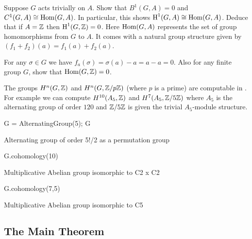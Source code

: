 \begin{exercise}\label{ex:H1hom}
	Suppose $G$ acts trivially on $A$.
	Show that $B^1(G,A)=0$ and $C^1(G,A) \cong \operatorname{Hom}(G,A)$.
	In particular, this shows $\operatorname{H}^1(G,A) \cong \operatorname{Hom}(G,A)$.
	Deduce that if $A = \mathbb{Z}$ then $\operatorname{H}^1(G,\mathbb{Z}) = 0$.
	Here $\operatorname{Hom}(G,A)$ represents the set of group homomorphisms
	from $G$ to $A$. It comes with a natural group structure
	given by $(f_1+f_2)(a) = f_1(a)+f_2(a)$.

	\begin{hint}
		For any $\sigma\in G$ we have
		$f_a(\sigma) = \sigma(a) - a = a - a = 0$.
		Also for any finite group $G$, show that $\operatorname{Hom}(G,\mathbb{Z}) = 0$.
	\end{hint}
\end{exercise}

\begin{example}
	The groups $H^n(G,\mathbb{Z})$ and $H^n(G,\mathbb{Z}/p\mathbb{Z})$ (where $p$ is a prime)
	are computable in \sage. For example we can compute $H^{10}(A_5,\mathbb{Z})$
	and $H^{7}(A_5,\mathbb{Z}/5\mathbb{Z})$ where $A_5$ is the alternating group of
	order $120$ and $\mathbb{Z}/5\mathbb{Z}$ is given the trivial $A_5$-module structure.
\begin{sagecode}
\begin{sagecell}
G = AlternatingGroup(5); G
\end{sagecell}
\begin{sageout}
Alternating group of order 5!/2 as a permutation group
\end{sageout}
\begin{sagecell}
G.cohomology(10)
\end{sagecell}
\begin{sageout}
Multiplicative Abelian group isomorphic to C2 x C2
\end{sageout}
\begin{sagecell}
G.cohomology(7,5)
\end{sagecell}
\begin{sageout}
Multiplicative Abelian group isomorphic to C5
\end{sageout}
\end{sagecode}
\end{example}

\subsection{The Main Theorem}

